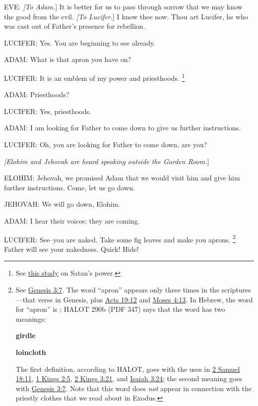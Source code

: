 			EVE: \textit{[To Adam.}] It is better for us to pass through sorrow that we may know the good from the evil. \textit{[To Lucifer.}] I know thee now. Thou art Lucifer, he who was cast out of Father's presence for rebellion.

			LUCIFER: Yes. You are beginning to see already.

			ADAM: What is that apron you have on?

			LUCIFER: It is an emblem of my power and priesthoods.%
				\footnote{%
					\label{ENDOWMENT-apron}%
					See \hyperref[SATAN-power]{this study} on Satan's power.
					}

			ADAM: Priesthoods?

			LUCIFER: Yes, priesthoods.

			ADAM: I am looking for Father to come down to give us further instructions.

			LUCIFER: Oh, you are looking for Father to come down, are you?

			\textit{[Elohim and Jehovah are heard speaking outside the Garden Room.}]

			ELOHIM: Jehovah, we promised Adam that we would visit him and give him further instructions. Come, let us go down.

			JEHOVAH: We will go down, Elohim.

			ADAM: I hear their voices; they are coming.

			LUCIFER: See--you are naked. Take some fig leaves and make you aprons.%
				\footnote{%
					\label{ENDOWMENT-aprons}%
					\label{CHAGORAH}%
					See \hyperref[GENESIS-3-7]{Genesis 3:7}. The word ``apron'' appears only three times in the scriptures---that verse in Genesis, plus \hyperref[ACTS-19-12]{Acts 19:12} and \hyperref[MOSES-4-13]{Moses 4:13}. In Hebrew, the word for ``apron'' is ; HALOT 290b (PDF 347) says that the word has two meanings:
						\begin{compactitem}
							\item[1] \textbf{girdle}
							\item[2] \textbf{loincloth}
						\end{compactitem}
					The first definition, according to HALOT, goes with the uses in \hyperref[2SAMUEL-18-11]{2 Samuel 18:11}, \hyperref[1KINGS-2-5]{1 Kings 2:5}, \hyperref[2KINGS-3-21]{2 Kings 3:21}, and \hyperref[ISAIAH-3-24]{Isaiah 3:24}; the second meaning goes with \hyperref[GENESIS-3-7]{Genesis 3:7}. Note that this word does \textit{not} appear in connection with the priestly clothes that we read about in Exodus.
					}
			Father will see your nakedness. Quick! Hide!

